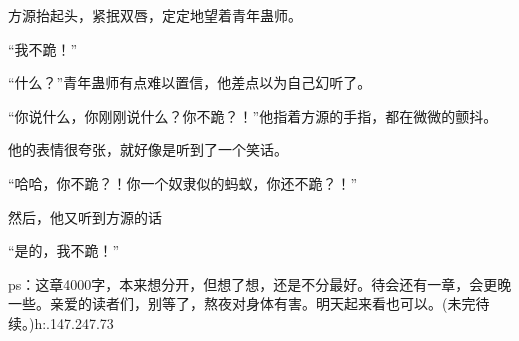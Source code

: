\begin{this_body}
方源抬起头，紧抿双唇，定定地望着青年蛊师。

“我不跪！”

“什么？”青年蛊师有点难以置信，他差点以为自己幻听了。

“你说什么，你刚刚说什么？你不跪？！”他指着方源的手指，都在微微的颤抖。

他的表情很夸张，就好像是听到了一个笑话。

“哈哈，你不跪？！你一个奴隶似的蚂蚁，你还不跪？！”

然后，他又听到方源的话

“是的，我不跪！”

ps：这章4000字，本来想分开，但想了想，还是不分最好。待会还有一章，会更晚一些。亲爱的读者们，别等了，熬夜对身体有害。明天起来看也可以。(未完待续。)h:.147.247.73

\end{this_body}

